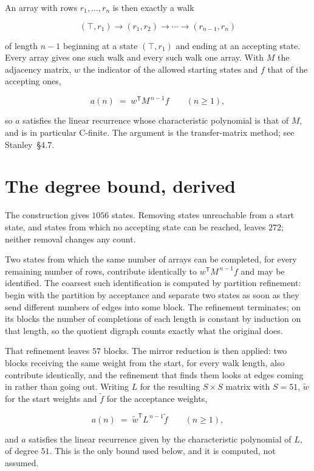\documentclass[11pt]{article}
\theoremstyle{definition}
\begin{document}
An array with rows $r_1,\dots,r_n$ is then exactly a walk

\[(\top,r_1) \to (r_1,r_2) \to \cdots \to (r_{n-1},r_n)\]

of length $n-1$ beginning at a state $(\top,r_1)$ and ending at an accepting state. Every array gives one such walk and every such walk one array. With $M$ the adjacency matrix, $w$ the indicator of the allowed starting states and $f$ that of the accepting ones,

\[a(n) \;=\; w^{\mathsf T} M^{\,n-1} f \qquad (n \ge 1),\]

so $a$ satisfies the linear recurrence whose characteristic polynomial is that of $M$, and is in particular C-finite. The argument is the transfer-matrix method; see Stanley~\S4.7.

\section{The degree bound, derived}

The construction gives $1056$ states. Removing states unreachable from a start state, and states from which no accepting state can be reached, leaves $272$; neither removal changes any count.

Two states from which the same number of arrays can be completed, for every remaining number of rows, contribute identically to $w^{\mathsf T}M^{\,n-1}f$ and may be identified. The coarsest such identification is computed by partition refinement: begin with the partition by acceptance and separate two states as soon as they send different numbers of edges into some block. The refinement terminates; on its blocks the number of completions of each length is constant by induction on that length, so the quotient digraph counts exactly what the original does.

That refinement leaves $57$ blocks. The mirror reduction is then applied: two blocks receiving the same weight from the start, for every walk length, also contribute identically, and the refinement that finds them looks at edges coming in rather than going out. Writing $L$ for the resulting $S \times S$ matrix with $S = 51$, $\tilde w$ for the start weights and $\tilde f$ for the acceptance weights,

\[a(n) \;=\; \tilde w^{\mathsf T} L^{\,n-1} \tilde f \qquad (n \ge 1),\]

and $a$ satisfies the linear recurrence given by the characteristic polynomial of $L$, of degree $51$. This is the only bound used below, and it is computed, not assumed.
\end{document}
